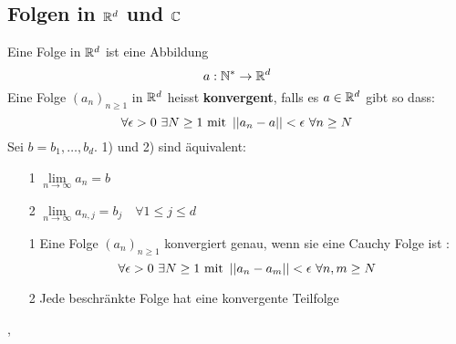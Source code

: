 \subsection{Folgen in \(\mathbb{R}^{d}\) und \(\mathbb{C}\)}
\Def[2.31] Eine Folge in \(\mathbb{R}^d\) ist eine Abbildung \[a : \mathbb{N}^* \rightarrow \mathbb{R}^d\] 
\Def[2.32] Eine Folge \((a_n)_{n \geq 1}\) in \(\mathbb{R}^d\) heisst \textbf{konvergent}, falls es \(a \in \mathbb{R}^d\) gibt so dass: \[\forall \epsilon > 0 \  \exists N \geq 1 \ \text{mit} \ \left\lvert \left\lvert a_n-a \right\rvert \right\rvert < \epsilon \  \forall n \geq N\]
\Satz[2.33] Sei \(b = b_1, \dots , b_d\). 1) und 2) sind äquivalent: 
\begin{enumerate}
    \item [1] \(\lim\limits_{n \rightarrow \infty} a_n = b\)
    \item [2] \(\lim\limits_{n \rightarrow \infty} a_{n,j} = b_j \quad \forall 1 \leq j \leq d\)
\end{enumerate}
\Satz[2.36]
\begin{enumerate}
    \item [1] Eine Folge \((a_n)_{n \geq 1}\) konvergiert genau, wenn sie eine Cauchy Folge ist : \[\forall \epsilon > 0 \ \exists N \geq 1 \ \text{mit} \ \abs{\abs{a_n - a_m}} < \epsilon \  \forall n,m \geq N\]
    \item [2] Jede beschränkte Folge hat eine konvergente Teilfolge
\end{enumerate}
\sep

